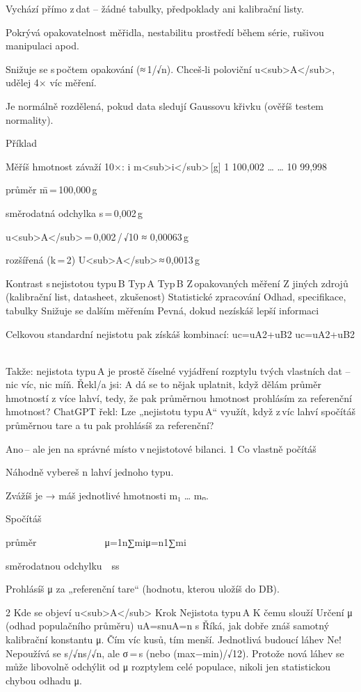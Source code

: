     Vychází přímo z dat – žádné tabulky, předpoklady ani kalibrační listy.

    Pokrývá opakovatelnost měřidla, nestabilitu prostředí během série, rušivou manipulaci apod.

    Snižuje se s počtem opakování (≈ 1/√n). Chceš‑li poloviční u<sub>A</sub>, udělej 4× víc měření.

    Je normálně rozdělená, pokud data sledují Gaussovu křivku (ověříš testem normality).

Příklad

Měříš hmotnost závaží 10×:
i	m<sub>i</sub> [g]
1	100,002
…	…
10	99,998

    průměr   m̄ = 100,000 g

    směrodatná odchylka s = 0,002 g

    u<sub>A</sub> = 0,002 / √10 ≈ 0,00063 g

    rozšířená (k = 2) U<sub>A</sub> ≈ 0,0013 g

Kontrast s nejistotou typu B
Typ A	Typ B
Z opakovaných měření	Z jiných zdrojů (kalibrační list, datasheet, zkušenost)
Statistické zpracování	Odhad, specifikace, tabulky
Snižuje se dalším měřením	Pevná, dokud nezískáš lepší informaci

Celkovou standardní nejistotu pak získáš kombinací:
uc=uA2+uB2
uc​=uA2​+uB2​
​

Takže: nejistota typu A je prostě číselné vyjádření rozptylu tvých vlastních dat – nic víc, nic míň.
Řekl/a jsi:
A dá se to nějak uplatnit, když dělám průměr hmotností z více lahví, tedy, že pak průměrnou hmotnost prohlásím za referenční hmotnost?
ChatGPT řekl:
Lze „nejistotu typu A“ využít, když z víc lahví spočítáš průměrnou tare a tu pak prohlásíš za referenční?

Ano – ale jen na správné místo v nejistotové bilanci.
1  Co vlastně počítáš

    Náhodně vybereš n lahví jednoho typu.

    Zvážíš je → máš jednotlivé hmotnosti m₁ … mₙ.

    Spočítáš

        průměr       μ=1n∑miμ=n1​∑mi​

        směrodatnou odchylku ss

    Prohlásíš μ za „referenční tare“ (hodnotu, kterou uložíš do DB).

2  Kde se objeví u<sub>A</sub>
Krok	Nejistota typu A	K čemu slouží
Určení μ (odhad populačního průměru)	uA=snuA​=n
​s​	Říká, jak dobře znáš samotný kalibrační konstantu μ. Čím víc kusů, tím menší.
Jednotlivá budoucí láhev	Ne! Nepoužívá se s/√ns/√n, ale σ = s (nebo (max−min)/√12).	Protože nová láhev se může libovolně odchýlit od μ rozptylem celé populace, nikoli jen statistickou chybou odhadu μ.

